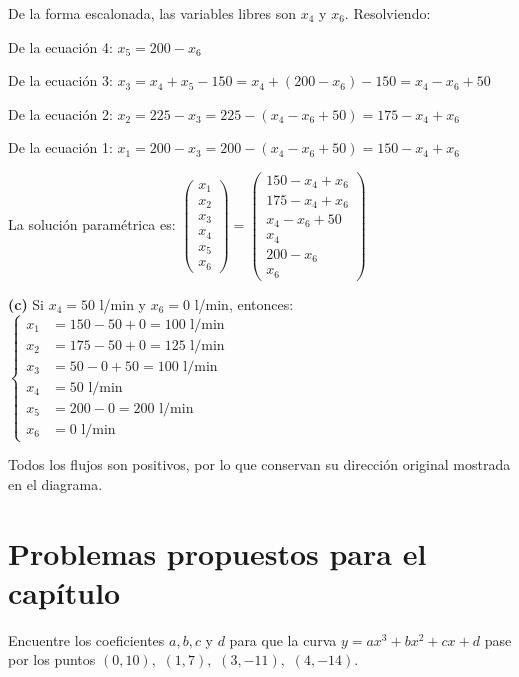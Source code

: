 \begin{prob}
\begin{myproof}
De la forma escalonada, las variables libres son $x_4$ y $x_6$. Resolviendo:

De la ecuación 4: $x_5 = 200 - x_6$

De la ecuación 3: $x_3 = x_4 + x_5 - 150 = x_4 + (200-x_6) - 150 = x_4 - x_6 + 50$

De la ecuación 2: $x_2 = 225 - x_3 = 225 - (x_4 - x_6 + 50) = 175 - x_4 + x_6$

De la ecuación 1: $x_1 = 200 - x_3 = 200 - (x_4 - x_6 + 50) = 150 - x_4 + x_6$

La solución paramétrica es: $\begin{pmatrix}
x_1 \\ x_2 \\ x_3 \\ x_4 \\ x_5 \\ x_6
\end{pmatrix} = \begin{pmatrix}
150 - x_4 + x_6 \\
175 - x_4 + x_6 \\
x_4 - x_6 + 50 \\
x_4 \\
200 - x_6 \\
x_6
\end{pmatrix}$

\textbf{(c)} Si $x_4 = 50$ l/min y $x_6 = 0$ l/min, entonces: $\begin{cases}
x_1 &= 150 - 50 + 0 = 100 \text{ l/min}\\
x_2 &= 175 - 50 + 0 = 125 \text{ l/min}\\
x_3 &= 50 - 0 + 50 = 100 \text{ l/min}\\
x_4 &= 50 \text{ l/min}\\
x_5 &= 200 - 0 = 200 \text{ l/min}\\
x_6 &= 0 \text{ l/min}
\end{cases}$

Todos los flujos son positivos, por lo que conservan su dirección original mostrada en el diagrama.
\end{myproof}
\end{prob}

\section{Problemas propuestos para el capítulo}
 
\begin{prob} Encuentre los coeficientes $a, b, c$ y $d$ para que la curva $y=ax^3+bx^2+cx+d$ pase por los puntos $(0,10),$ $(1,7),$ $(3,-11),$ $(4,-14)$.\end{prob}

